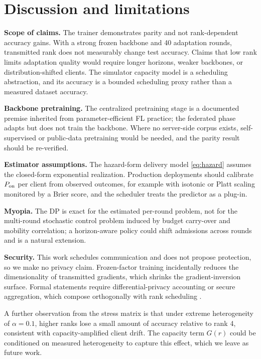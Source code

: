 \documentclass[preprint,12pt]{elsarticle}
\begin{document}
\section{Discussion and limitations}
\label{sec:discussion}
\textbf{Scope of claims.} The trainer demonstrates parity and not rank-dependent accuracy gains. With a strong frozen backbone and 40 adaptation rounds, transmitted rank does not measurably change test accuracy. Claims that low rank limits adaptation quality would require longer horizons, weaker backbones, or distribution-shifted clients. The simulator capacity model is a scheduling abstraction, and its accuracy is a bounded scheduling proxy rather than a measured dataset accuracy.

\textbf{Backbone pretraining.} The centralized pretraining stage is a documented premise inherited from parameter-efficient FL practice; the federated phase adapts but does not train the backbone. Where no server-side corpus exists, self-supervised or public-data pretraining would be needed, and the parity result should be re-verified.

\textbf{Estimator assumptions.} The hazard-form delivery model \eqref{eq:hazard} assumes the closed-form exponential realization. Production deployments should calibrate $P_{\rm on}$ per client from observed outcomes, for example with isotonic or Platt scaling monitored by a Brier score, and the scheduler treats the predictor as a plug-in.

\textbf{Myopia.} The DP is exact for the estimated per-round problem, not for the multi-round stochastic control problem induced by budget carry-over and mobility correlation; a horizon-aware policy could shift admissions across rounds and is a natural extension.

\textbf{Security.} This work schedules communication and does not propose protection, so we make no privacy claim. Frozen-factor training incidentally reduces the dimensionality of transmitted gradients, which shrinks the gradient-inversion surface. Formal statements require differential-privacy accounting or secure aggregation, which compose orthogonally with rank scheduling \cite{bonawitz2017secureagg,wei2023pfl_dp}.

A further observation from the stress matrix is that under extreme heterogeneity of $\alpha{=}0.1$, higher ranks lose a small amount of accuracy relative to rank 4, consistent with capacity-amplified client drift. The capacity term $G(r)$ could be conditioned on measured heterogeneity to capture this effect, which we leave as future work.
\end{document}

